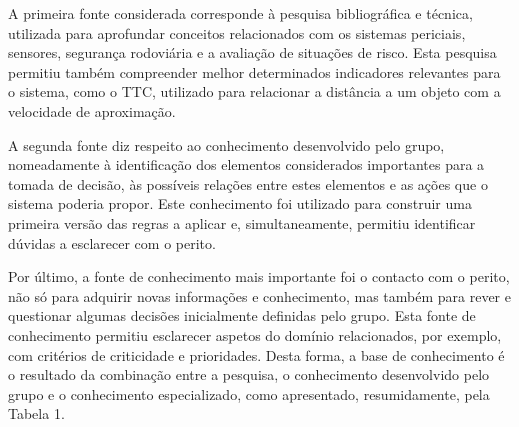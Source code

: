 A primeira fonte considerada corresponde à pesquisa bibliográfica e técnica, utilizada para
aprofundar conceitos relacionados com os sistemas periciais, sensores, segurança rodoviária e a
avaliação de situações de risco. Esta pesquisa permitiu também compreender melhor determinados
indicadores relevantes para o sistema, como o TTC, utilizado para relacionar a distância a um
objeto com a velocidade de aproximação.

A segunda fonte diz respeito ao conhecimento desenvolvido pelo grupo, nomeadamente à identificação dos elementos considerados importantes para a tomada de decisão, às possíveis relações entre estes elementos e as ações que o sistema poderia propor. Este conhecimento foi utilizado para construir uma primeira versão das regras a aplicar e, simultaneamente, permitiu identificar dúvidas a esclarecer com o perito.

Por último, a fonte de conhecimento mais importante foi o contacto com o perito, não só para adquirir novas informações e conhecimento, mas também para rever e questionar algumas decisões inicialmente definidas pelo grupo. Esta fonte de conhecimento permitiu esclarecer aspetos do domínio relacionados, por exemplo, com critérios de criticidade e prioridades. Desta forma, a base de conhecimento é o resultado da combinação entre a pesquisa, o conhecimento desenvolvido pelo grupo e o conhecimento especializado, como apresentado, resumidamente, pela Tabela 1.

